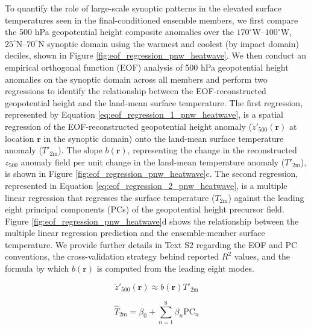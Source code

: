 \documentclass[final]{agujournal2019}
\begin{document}
To quantify the role of large-scale synoptic patterns in the elevated surface temperatures seen in the final-conditioned ensemble members, we first compare the 500 hPa geopotential height composite anomalies over the $170^{\circ}\mathrm{W}$--$100^{\circ}\mathrm{W}$, $25^{\circ}\mathrm{N}$--$70^{\circ}\mathrm{N}$ synoptic domain using the warmest and coolest (by impact domain) deciles, shown in Figure \ref{fig:eof_regression_pnw_heatwave}. We then conduct an empirical orthogonal function (EOF) analysis of 500 hPa geopotential height anomalies on the synoptic domain across all members and perform two regressions to identify the relationship between the EOF-reconstructed geopotential height and the land-mean surface temperature. The first regression, represented by Equation \ref{eq:eof_regression_1_pnw_heatwave}, is a spatial regression of the EOF-reconstructed geopotential height anomaly ($\tilde{z}'_{500}(\mathbf{r})$ at location $\mathbf{r}$ in the synoptic domain) onto the land-mean surface temperature anomaly ($T'_{\mathrm{2m}}$). The slope $b(\mathbf{r})$, representing the change in the reconstructed $z_{500}$ anomaly field per unit change in the land-mean temperature anomaly ($T'_{\mathrm{2m}}$), is shown in Figure \ref{fig:eof_regression_pnw_heatwave}c. The second regression, represented in Equation \ref{eq:eof_regression_2_pnw_heatwave}, is a multiple linear regression that regresses the surface temperature ($T_{\mathrm{2m}}$) against the leading eight principal components (PCs) of the geopotential height precursor field. Figure \ref{fig:eof_regression_pnw_heatwave}d shows the relationship between the multiple linear regression prediction and the ensemble-member surface temperature. We provide further details in Text S2 regarding the EOF and PC conventions, the cross-validation strategy behind reported $R^2$ values, and the formula by which $b(\mathbf{r})$ is computed from the leading eight modes.

\begin{equation}
\label{eq:eof_regression_1_pnw_heatwave}
    \tilde{z}'_{500}(\mathbf{r}) \approx b(\mathbf{r}) T'_{\mathrm{2m}}
\end{equation}

\begin{equation}
\label{eq:eof_regression_2_pnw_heatwave}
    \hat{T}_{\mathrm{2m}} = \beta_0 + \sum_{n=1}^{8} \beta_n \text{PC}_{n}
\end{equation}
\end{document}

